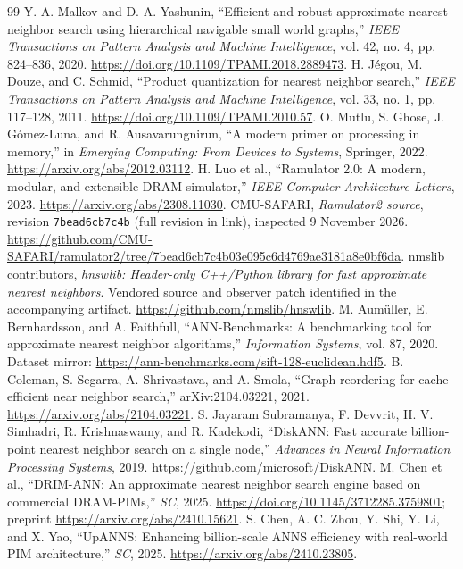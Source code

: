 \begin{thebibliography}{99}
 Y. A. Malkov and D. A. Yashunin, ``Efficient and robust approximate nearest neighbor search using hierarchical navigable small world graphs,'' \emph{IEEE Transactions on Pattern Analysis and Machine Intelligence}, vol. 42, no. 4, pp. 824--836, 2020. \url{https://doi.org/10.1109/TPAMI.2018.2889473}.
 H. J\'egou, M. Douze, and C. Schmid, ``Product quantization for nearest neighbor search,'' \emph{IEEE Transactions on Pattern Analysis and Machine Intelligence}, vol. 33, no. 1, pp. 117--128, 2011. \url{https://doi.org/10.1109/TPAMI.2010.57}.
 O. Mutlu, S. Ghose, J. G\'omez-Luna, and R. Ausavarungnirun, ``A modern primer on processing in memory,'' in \emph{Emerging Computing: From Devices to Systems}, Springer, 2022. \url{https://arxiv.org/abs/2012.03112}.
 H. Luo et al., ``Ramulator 2.0: A modern, modular, and extensible DRAM simulator,'' \emph{IEEE Computer Architecture Letters}, 2023. \url{https://arxiv.org/abs/2308.11030}.
 CMU-SAFARI, \emph{Ramulator2 source}, revision \texttt{7bead6cb7c4b} (full revision in link), inspected 9 November 2026. \url{https://github.com/CMU-SAFARI/ramulator2/tree/7bead6cb7c4b03e095c6d4769ae3181a8e0bf6da}.
 nmslib contributors, \emph{hnswlib: Header-only C++/Python library for fast approximate nearest neighbors}. Vendored source and observer patch identified in the accompanying artifact. \url{https://github.com/nmslib/hnswlib}.
 M. Aum\"uller, E. Bernhardsson, and A. Faithfull, ``ANN-Benchmarks: A benchmarking tool for approximate nearest neighbor algorithms,'' \emph{Information Systems}, vol. 87, 2020. Dataset mirror: \url{https://ann-benchmarks.com/sift-128-euclidean.hdf5}.
 B. Coleman, S. Segarra, A. Shrivastava, and A. Smola, ``Graph reordering for cache-efficient near neighbor search,'' arXiv:2104.03221, 2021. \url{https://arxiv.org/abs/2104.03221}.
 S. Jayaram Subramanya, F. Devvrit, H. V. Simhadri, R. Krishnaswamy, and R. Kadekodi, ``DiskANN: Fast accurate billion-point nearest neighbor search on a single node,'' \emph{Advances in Neural Information Processing Systems}, 2019. \url{https://github.com/microsoft/DiskANN}.
 M. Chen et al., ``DRIM-ANN: An approximate nearest neighbor search engine based on commercial DRAM-PIMs,'' \emph{SC}, 2025. \url{https://doi.org/10.1145/3712285.3759801}; preprint \url{https://arxiv.org/abs/2410.15621}.
 S. Chen, A. C. Zhou, Y. Shi, Y. Li, and X. Yao, ``UpANNS: Enhancing billion-scale ANNS efficiency with real-world PIM architecture,'' \emph{SC}, 2025. \url{https://arxiv.org/abs/2410.23805}.

\end{thebibliography}
